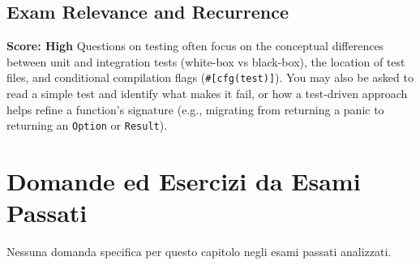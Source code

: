 \subsection*{Exam Relevance and Recurrence}
\textbf{Score: High}
Questions on testing often focus on the conceptual differences between unit and integration tests (white-box vs black-box), the location of test files, and conditional compilation flags (\texttt{\#[cfg(test)]}). You may also be asked to read a simple test and identify what makes it fail, or how a test-driven approach helps refine a function's signature (e.g., migrating from returning a panic to returning an \texttt{Option} or \texttt{Result}).

\section{Domande ed Esercizi da Esami Passati}

Nessuna domanda specifica per questo capitolo negli esami passati analizzati.

